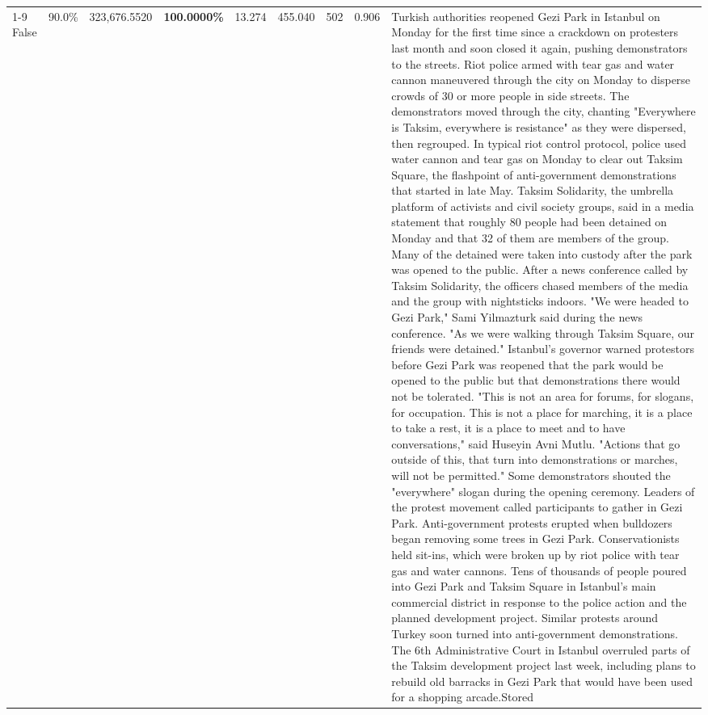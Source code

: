 \begin{table}[H]
\begin{tabular}{lllrlllll}
\cline{1-9}
False & 90.0\% & 323,676.5520 & \bfseries \color{red} 100.0000\% & 13.274 & 455.040 & 502 & 0.906 & Turkish authorities reopened Gezi Park in Istanbul on Monday for the first time since a crackdown on protesters last month and soon closed it again, pushing demonstrators to the streets. Riot police armed with tear gas and water cannon maneuvered through the city on Monday to disperse crowds of 30 or more people in side streets. The demonstrators moved through the city, chanting "Everywhere is Taksim, everywhere is resistance" as they were dispersed, then regrouped. In typical riot control protocol, police used water cannon and tear gas on Monday to clear out Taksim Square, the flashpoint of anti-government demonstrations that started in late May. Taksim Solidarity, the umbrella platform of activists and civil society groups, said in a media statement that roughly 80 people had been detained on Monday and that 32 of them are members of the group. Many of the detained were taken into custody after the park was opened to the public. After a news conference called by Taksim Solidarity, the officers chased members of the media and the group with nightsticks indoors. "We were headed to Gezi Park," Sami Yilmazturk said during the news conference. "As we were walking through Taksim Square, our friends were detained." Istanbul's governor warned protestors before Gezi Park was reopened that the park would be opened to the public but that demonstrations there would not be tolerated. "This is not an area for forums, for slogans, for occupation. This is not a place for marching, it is a place to take a rest, it is a place to meet and to have conversations," said Huseyin Avni Mutlu. "Actions that go outside of this, that turn into demonstrations or marches, will not be permitted." Some demonstrators shouted the "everywhere" slogan during the opening ceremony. Leaders of the protest movement called participants to gather in Gezi Park. Anti-government protests erupted when bulldozers began removing some trees in Gezi Park. Conservationists held sit-ins, which were broken up by riot police with tear gas and water cannons. Tens of thousands of people poured into Gezi Park and Taksim Square in Istanbul's main commercial district in response to the police action and the planned development project. Similar protests around Turkey soon turned into anti-government demonstrations. The 6th Administrative Court in Istanbul overruled parts of the Taksim development project last week, including plans to rebuild old barracks in Gezi Park that would have been used for a shopping arcade.Stored \\

\end{tabular}
\end{table}
